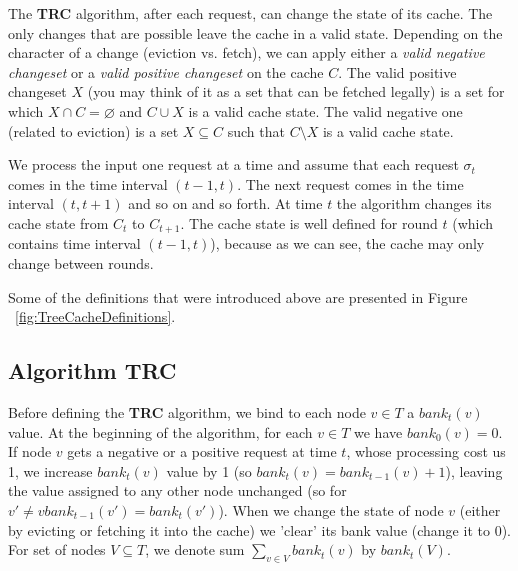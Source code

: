The \textbf{TRC} algorithm, after each request, can change the state of its
cache. The only changes that are possible leave the cache in a valid state.
Depending on the character of a change (eviction vs. fetch), we can apply either a
\textit{valid negative changeset} or a \textit{valid positive changeset} on the
cache $C$. The valid positive changeset $X$ (you may think of it as a set that
can be fetched legally) is a set for which $X \cap C = \varnothing$ and $C \cup
X$ is a valid cache state. The valid negative one (related to eviction) is a set $X
\subseteq C$ such that $C \setminus X$ is a valid cache state.

We process the input one request at a time and assume that each request $\sigma_t$
comes in the time interval $(t-1, t)$. The next request comes in the time
interval $(t, t + 1)$ and so on and so forth. At time $t$ the algorithm changes its
cache state from $C_{t}$ to $C_{t+1}$. The cache state is well defined for round
$t$ (which contains time interval $(t-1, t)$), because as we can see, the cache
may only change between rounds.

Some of the definitions that were introduced above are presented in 
Figure ~\ref{fig:TreeCacheDefinitions}.



\subsection{Algorithm TRC}

Before defining the \textbf{TRC} algorithm, we bind to each node $v \in T$ a
$bank_{t}(v)$ value. At the beginning of the algorithm, for each $v \in T$ we
have $bank_{0}(v) = 0$. If node $v$ gets a negative or a positive request at
time $t$, whose processing cost us 1, we increase $bank_{t}(v)$ value by 1 (so
$bank_{t}(v) = bank_{t-1}(v) + 1$), leaving the value assigned to any other node
unchanged (so for $v' \neq v bank_{t-1}(v') = bank_{t}(v')$). When we change the
state of node $v$ (either by evicting or fetching it into the cache) we 'clear'
its bank value (change it to $0$). For set of nodes $V \subseteq T$, we denote
sum $\sum_{v \in V} bank_{t}(v)$ by $bank_{t}(V)$.

